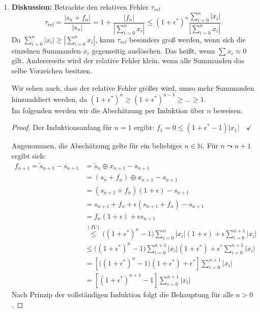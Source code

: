 \documentclass[9pt]{extarticle}
\theoremstyle{named}
\begin{document}
\begin{enumerate}[label=(\alph*)]
	
	\item \textbf{Diskussion:} Betrachte den relativen Fehler $\tau_{rel}$
	\[
			\tau_{rel} = \frac{|s_n+f_n|}{|s_n|} = 1 + \frac{|f_n|}{|\sum^{n}_{i=0}x_i|} \leq  (1+\epsilon^*)^{n}\frac{ \sum^{n}_{i=0}|x_i|}{|\sum^{n}_{i=0}x_i|}.
	\]
	Da $ \sum^{n}_{i=0}|x_i| \geq |\sum^{n}_{i=0}x_i|$, kann $\tau_{rel}$ besonders groß werden, wenn sich die einzelnen Summanden $x_i$ gegenseitig auslöschen. Das heißt, wenn $\sum x_i \approx 0$ gilt. Andererseits wird der relative Fehler klein, wenn alle Summanden das selbe Vorzeichen besitzen.
	
	Wir sehen auch, dass der relative Fehler größer wird, umso mehr Summanden hinzuaddiert werden, da $(1+\epsilon^*)^n \geq (1+\epsilon^*)^{n-1} \geq ... \geq 1$.\\
	
	Im folgenden werden wir die Abschätzung per Induktion über $n$ beweisen.
	\begin{proof}
		Der Induktionsanfang für $n=1$ ergibt: $f_1 = 0 \leq (1+\epsilon^*-1)|x_1| \quad \checkmark$ 
		
		Angenommen, die Abschätzung gelte für ein beliebiges $n \in \mathbb N$. Für $n \leadsto n+1$ ergibt sich:
		\begin{align*}
			f_{n+1} = \tilde s_{n+1} - s_{n+1} &= \tilde s_{n} \oplus x_{n+1} - s_{n+1}\\
			&= (s_n + f_n) \oplus x_{n+1} - s_{n+1} \\
			&= (s_{n+1} + f_n)(1+ \epsilon) - s_{n+1} \\
			&= s_{n+1} + f_n + \epsilon(s_{n+1} + f_n) - s_{n+1} \\
			&= f_n(1+\epsilon) + \epsilon s_{n+1} \\
			& \overset{(IV)}{\leq} \big((1+\epsilon^*)^n-1\big) \sum^{n}_{i=0}|x_i| (1+\epsilon) +  \epsilon \sum^{n+1}_{i=0}|x_i| \\
			& \leq \big((1+\epsilon^*)^n-1\big) \sum^{n+1}_{i=0}|x_i| (1+\epsilon^*) +  \epsilon^*\sum^{n+1}_{i=0}|x_i| \\
			&=  [\big((1+\epsilon^*)^n-1\big)(1+\epsilon^*) + \epsilon^* ] \sum^{n+1}_{i=0}|x_i|  \\
			&= [(1+\epsilon^*)^{n+1}-1 ] \sum^{n+1}_{i=0}|x_i| 
		\end{align*}
		Nach Prinzip der vollständigen Induktion folgt die Behauptung für alle $n > 0$.
	\end{proof}


\end{enumerate}
\end{document}
